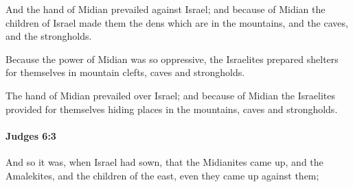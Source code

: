 			\begin{versebox}
					\item[BHS] 
					\item[ASV] And the hand of Midian prevailed against Israel; and because of Midian the children of Israel made them the dens which are in the mountains, and the caves, and the strongholds.
					\item[NIV] Because the power of Midian was so oppressive, the Israelites prepared shelters for themselves in mountain clefts, caves and strongholds.
					\item[NRSV] The hand of Midian prevailed over Israel; and because of Midian the Israelites provided for themselves hiding places in the mountains, caves and strongholds.
			\end{versebox}

		\paragraph{Judges 6:3} %
			\label{JUDGES-6-3}

			And so it was, when Israel had sown, that the Midianites came up, and the Amalekites, and the children of the east, even they came up against them;

